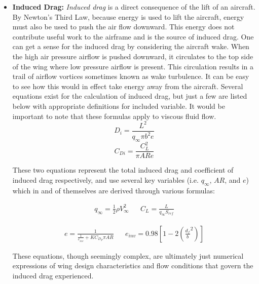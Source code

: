 \documentclass{report}
\begin{document}
\begin{itemize}
        \begin{itemize}
            \item \textbf{Induced Drag:} \textit{Induced drag} is a direct consequence of the lift of an aircraft. By Newton's Third Law, because energy is used to lift
            the aircraft, energy must also be used to push the air flow downward. This energy does not contribute useful work to the airframe and is the source of induced drag.
            One can get a sense for the induced drag by considering the aircraft wake. When the high air pressure airflow is pushed downward, it circulates to the top side of the wing
            where low pressure airflow is present. This circulation results in a trail of airflow vortices sometimes known as wake turbulence. It can be easy to see how this would 
            in effect take energy away from the aircraft. Several equations exist for the calculation of induced drag, but just a few are listed below with appropriate definitions for included variable.
            It would be important to note that these formulas apply to viscous fluid flow.
            \begin{equation}
            D_i = \frac{L^2}{q_{\infty}\pi b^2 e}
            \end{equation}
            \begin{equation}
            C_{Di} = \frac{C_L^2}{\pi ARe}\label{eq:drag_eq}
            \end{equation}

            These two equations represent the total induced drag and coefficient of induced drag respectively,
            and use several key variables (i.e. $q_{\infty}$, $AR$, and $e$) which in and of themselves are derived through
            various formulas:

            \begin{align*}
            q_{\infty} = \frac{1}{2} \rho V_{\infty}^2 && C_L = \frac{L}{q_{\infty} S_{ref}}
            \end{align*}

            \begin{align*}
            e = \frac{1}{\displaystyle \frac{1}{e_{inv}}+KC_{D_P}\pi AR}  && e_{inv} = 0.98\left[1-2\left(\frac{d_f}{b}^2  \right) \right]
            \end{align*}
            
            These equations, though seemingly complex, are ultimately just numerical expressions of wing design characteristics and
            flow conditions that govern the induced drag experienced.


\end{itemize}
\end{itemize}
\end{document}
